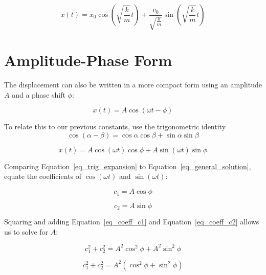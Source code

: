 \documentclass{article}
\begin{document}
\begin{equation}
x(t) = x_0 \cos\left(\sqrt{\frac{k}{m}} t\right) + \frac{v_0}{\sqrt{\frac{k}{m}}}\sin\left(\sqrt{\frac{k}{m}} t\right)
\label{eq_specific_solution}
\end{equation}

\section{Amplitude-Phase Form}

The displacement can also be written in a more compact form using an amplitude $A$ and a phase shift $\phi$:

\begin{equation}
x(t) = A \cos(\omega t - \phi)
\label{eq_amplitude_phase_form}
\end{equation}

To relate this to our previous constants, use the trigonometric identity 
\begin{equation}
\cos(\alpha - \beta) = \cos \alpha \cos \beta + \sin \alpha \sin \beta
\label{cos_difference}
\end{equation}


\begin{equation}
x(t) = A \cos(\omega t) \cos \phi + A \sin(\omega t) \sin \phi
\label{eq_trig_expansion}
\end{equation}

Comparing Equation~\ref{eq_trig_expansion} to Equation~\ref{eq_general_solution},  equate the coefficients of $\cos(\omega t)$ and $\sin(\omega t)$:

\begin{equation}
c_1 = A \cos \phi
\label{eq_coeff_c1}
\end{equation}

\begin{equation}
c_2 = A \sin \phi
\label{eq_coeff_c2}
\end{equation}

Squaring and adding Equation~\ref{eq_coeff_c1} and Equation~\ref{eq_coeff_c2} allows us to solve for $A$:

\begin{equation}
c_1^2 + c_2^2 = A^2 \cos^2 \phi + A^2 \sin^2 \phi
\label{eq_pythagorean_sum}
\end{equation}

\begin{equation}
c_1^2 + c_2^2 = A^2 (\cos^2 \phi + \sin^2 \phi)
\label{eq_pythagorean_factor}
\end{equation}
\end{document}
